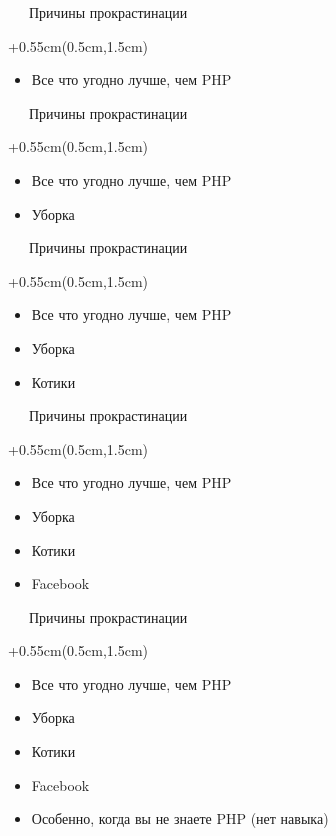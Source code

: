 \documentclass[xetex,18pt,aspectratio=169]{beamer}
\begin{document}
\begin{Large}
\begin{frame}{\ \ \ Причины прокрастинации}
\begin{textblock*}{\framewidth+0.55cm}(0.5cm,1.5cm)
\begin{itemize}
  \item Все что угодно лучше, чем PHP
\end{itemize}
\end{textblock*}
\end{frame}

\begin{frame}{\ \ \ Причины прокрастинации}
\begin{textblock*}{\framewidth+0.55cm}(0.5cm,1.5cm)
\begin{itemize}
  \item Все что угодно лучше, чем PHP
  \item Уборка
\end{itemize}
\end{textblock*}
\end{frame}

\begin{frame}{\ \ \ Причины прокрастинации}
\begin{textblock*}{\framewidth+0.55cm}(0.5cm,1.5cm)
\begin{itemize}
  \item Все что угодно лучше, чем PHP
  \item Уборка
  \item Котики
\end{itemize}
\end{textblock*}
\end{frame}

\begin{frame}{\ \ \ Причины прокрастинации}
\begin{textblock*}{\framewidth+0.55cm}(0.5cm,1.5cm)
\begin{itemize}
  \item Все что угодно лучше, чем PHP
  \item Уборка
  \item Котики
  \item Facebook
\end{itemize}
\end{textblock*}
\end{frame}

\begin{frame}{\ \ \ Причины прокрастинации}
\begin{textblock*}{\framewidth+0.55cm}(0.5cm,1.5cm)
\begin{itemize}
  \item Все что угодно лучше, чем PHP
  \item Уборка
  \item Котики
  \item Facebook
  \item Особенно, когда вы не знаете PHP (нет навыка)
\end{itemize}
\end{textblock*}
\end{frame}


\end{Large}
\end{document}
